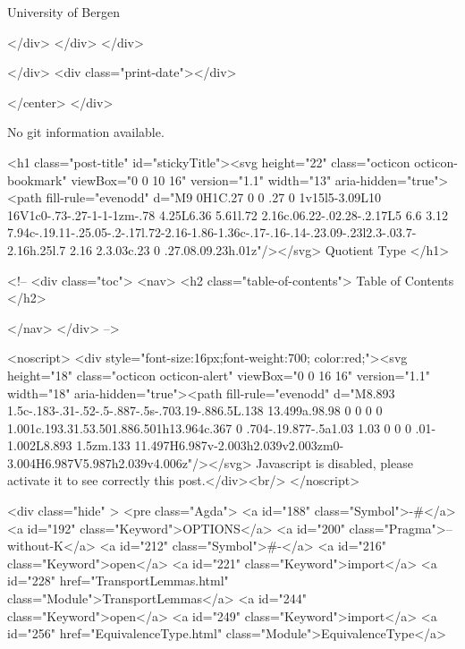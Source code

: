                   University of Bergen
                
                </div>
            </div>
          </div>
          
          
        </div>
        <div class="print-date"></div>
        
        
    </center>
  </div>

  
  No git information available.
  
  <h1 class="post-title" id="stickyTitle"><svg height="22" class="octicon octicon-bookmark" viewBox="0 0 10 16" version="1.1" width="13" aria-hidden="true"><path fill-rule="evenodd" d="M9 0H1C.27 0 0 .27 0 1v15l5-3.09L10 16V1c0-.73-.27-1-1-1zm-.78 4.25L6.36 5.61l.72 2.16c.06.22-.02.28-.2.17L5 6.6 3.12 7.94c-.19.11-.25.05-.2-.17l.72-2.16-1.86-1.36c-.17-.16-.14-.23.09-.23l2.3-.03.7-2.16h.25l.7 2.16 2.3.03c.23 0 .27.08.09.23h.01z"/></svg> Quotient Type
  </h1>

  <!-- 
  <div class="toc">
    <nav>
    <h2 class="table-of-contents"> Table of Contents </h2>
      

    </nav>
  </div>
   -->

  <noscript>
  <div style="font-size:16px;font-weight:700; color:red;"><svg height="18" class="octicon octicon-alert" viewBox="0 0 16 16" version="1.1" width="18" aria-hidden="true"><path fill-rule="evenodd" d="M8.893 1.5c-.183-.31-.52-.5-.887-.5s-.703.19-.886.5L.138 13.499a.98.98 0 0 0 0 1.001c.193.31.53.501.886.501h13.964c.367 0 .704-.19.877-.5a1.03 1.03 0 0 0 .01-1.002L8.893 1.5zm.133 11.497H6.987v-2.003h2.039v2.003zm0-3.004H6.987V5.987h2.039v4.006z"/></svg> Javascript is disabled, please activate it to see correctly this post.</div><br/>
  </noscript>

  <div class="hide" >
<pre class="Agda">
<a id="188" class="Symbol">{-#</a> <a id="192" class="Keyword">OPTIONS</a> <a id="200" class="Pragma">--without-K</a> <a id="212" class="Symbol">#-}</a>
<a id="216" class="Keyword">open</a> <a id="221" class="Keyword">import</a> <a id="228" href="TransportLemmas.html" class="Module">TransportLemmas</a>
<a id="244" class="Keyword">open</a> <a id="249" class="Keyword">import</a> <a id="256" href="EquivalenceType.html" class="Module">EquivalenceType</a>

